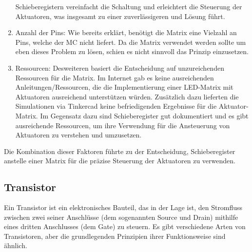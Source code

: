 \begin{enumerate}
	Schieberegistern vereinfacht die Schaltung und erleichtert die Steuerung der Aktuatoren, was insgesamt zu einer
	zuverlässigeren und Lösung führt. %
	\item Anzahl der Pins: Wie bereits erklärt, benötigt die Matrix eine Vielzahl an Pins, welche der \ac{MC} %
	nicht liefert. Da die Matrix verwendet werden sollte um eben dieses Problem zu lösen, schien es nicht sinnvoll
	das Prinzip einzusetzen. %
	\item Ressourcen: Desweiteren basiert die Entscheidung auf unzureichenden Ressourcen für die Matrix. Im Internet gab es
	keine ausreichenden Anleitungen/Ressourcen, die die Implementierung einer LED-Matrix mit Aktuatoren ausreichend
	unterstützen würden. Zusätzlich dazu lieferten die Simulationen via Tinkercad keine befriedigenden Ergebnisse %
	für die Aktuator-Matrix.
	Im Gegensatz dazu sind Schieberegister gut dokumentiert und es gibt ausreichende Ressourcen, um ihre
	Verwendung für die Ansteuerung von Aktuatoren zu verstehen und umzusetzen.
\end{enumerate}

Die Kombination dieser Faktoren führte zu der Entscheidung, Schieberegister anstelle einer Matrix für die präzise Steuerung der Aktuatoren zu verwenden. %


\subsection{Transistor}
Ein Transistor ist ein elektronisches Bauteil, das in der Lage ist, den Stromfluss zwischen zwei seiner Anschlüsse
(dem sogenannten Source und Drain) mithilfe eines dritten Anschlusses (dem Gate) zu steuern. Es gibt verschiedene Arten
von Transistoren, aber die grundlegenden Prinzipien ihrer Funktionsweise sind ähnlich.

